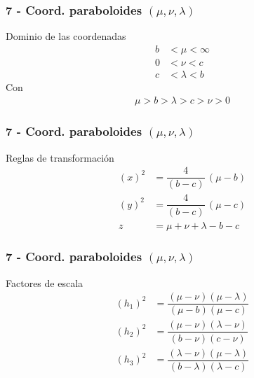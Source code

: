 \documentclass[12pt]{beamer}
\begin{document}
\begin{frame}
\frametitle{7 - Coord. paraboloides $(\mu, \nu, \lambda)$}
\fontsize{12}{12}\selectfont
Dominio de las coordenadas
\begin{align*}
b &< \mu < \infty \\
0 &< \nu < c \\
c &< \lambda < b
\end{align*}
Con
\begin{align*}
\mu > b > \lambda > c > \nu > 0
\end{align*}
\end{frame}
\begin{frame}
\frametitle{7 - Coord. paraboloides $(\mu, \nu, \lambda)$}
\fontsize{12}{12}\selectfont
Reglas de transformación
\begin{align*}
(x)^{2} &= \dfrac{4}{(b - c)} \, (\mu - b) \\[0.5em]
(y)^{2} &= \dfrac{4}{(b - c)} \, (\mu - c) \\[0.5em]
z &= \mu + \nu + \lambda - b - c
\end{align*}
\end{frame}
\begin{frame}
\frametitle{7 - Coord. paraboloides $(\mu, \nu, \lambda)$}
\fontsize{12}{12}\selectfont
Factores de escala
\begin{align*}
(h_{1})^{2} &= \dfrac{(\mu - \nu)(\mu - \lambda)}{(\mu - b)(\mu - c)} \\[0.5em]
(h_{2})^{2} &= \dfrac{(\mu - \nu)(\lambda - \nu)}{(b - \nu)(c - \nu)} \\[0.5em]
(h_{3})^{2} &= \dfrac{(\lambda - \nu)(\mu - \lambda)}{(b - \lambda)(\lambda - c)}
\end{align*}
\end{frame}
\end{document}
